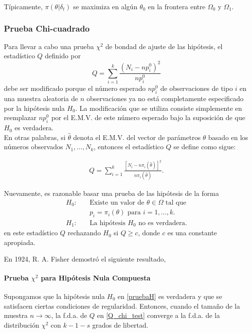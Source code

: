 \documentclass{book}
\begin{document}
Típicamente, $\pi(\theta|\delta_t)$ se maximiza en algún $\theta_0$ en la frontera entre $\Omega_0$ y $\Omega_1$.


\subsubsection{Prueba Chi-cuadrado}
Para llevar a cabo una prueba $\chi^2$ de bondad de ajuste de las hipótesis, el estadístico $Q$ definido por 
$$Q = \sum_{i=1}^{k} \frac{(N_i - np_i^0)^2}{np_i^0}$$
debe ser modificado porque el número esperado $np_i^0$ de observaciones de tipo $i$ en una muestra aleatoria de $n$ observaciones ya no está completamente especificado por la hipótesis nula $H_0$. La modificación que se utiliza consiste simplemente en reemplazar $np_i^0$ por el E.M.V. de este número esperado bajo la suposición de que $H_0$ es verdadera.\\
En otras palabras, si $\hat{\theta}$ denota el E.M.V. del vector de parámetros $\theta$ basado en los números observados $N_1, \ldots, N_k$, entonces el estadístico $Q$ se define como sigue:

\begin{align} \label{Q_chi_test}
Q = \sum_{i=1}^{k} \frac{[N_i - n\pi_i(\hat{\theta})]^2}{n\pi_i(\hat{\theta})}.
\end{align}

Nuevamente, es razonable basar una prueba de las hipótesis de la forma
\begin{align} \label{pruebaH}
H_0: \quad &\text{Existe un valor de } \theta \in \Omega \text{ tal que}\\
&p_i = \pi_i(\theta) \text{ para } i = 1, \ldots, k.\\
H_1: \quad &\text{La hipótesis } H_0 \text{ no es verdadera.}
\end{align}
en este estadístico $Q$ rechazando $H_0$ si $Q \geq c$, donde $c$ es una constante apropiada. 

En 1924, R. A. Fisher demostró el siguiente resultado,

\paragraph{Prueba $\chi^2$ para Hipótesis Nula Compuesta}

Supongamos que la hipótesis nula $H_0$ en \ref{pruebaH} es verdadera y que se satisfacen ciertas condiciones de regularidad. Entonces, cuando el tamaño de la muestra $n \to \infty$, la f.d.a. de $Q$ en \ref{Q_chi_test} converge a la f.d.a. de la distribución $\chi^2$ con $k - 1 - s$ grados de libertad.
\end{document}
